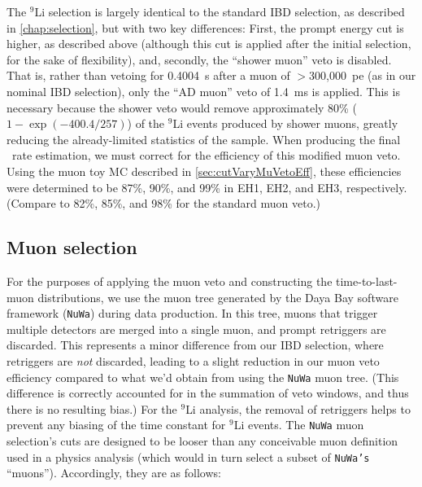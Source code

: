 \documentclass[../thesis.tex]{subfiles}
\begin{document}
The $^9$Li selection is largely identical to the standard IBD selection, as described in \autoref{chap:selection}, but with two key differences: First, the prompt energy cut is higher, as described above (although this cut is applied after the initial selection, for the sake of flexibility), and, secondly, the ``shower muon'' veto is disabled. That is, rather than vetoing for 0.4004~s after a muon of $>$300,000~pe (as in our nominal IBD selection), only the ``AD muon'' veto of 1.4~ms is applied. This is necessary because the shower veto would remove approximately 80\% ($1 - \exp(-400.4/257)$) of the $^9$Li events produced by shower muons, greatly reducing the already-limited statistics of the sample. When producing the final \linine\ rate estimation, we must correct for the efficiency of this modified muon veto. Using the muon toy MC described in \autoref{sec:cutVaryMuVetoEff}, these efficiencies were determined to be 87\%, 90\%, and 99\% in EH1, EH2, and EH3, respectively. (Compare to 82\%, 85\%, and 98\% for the standard muon veto.)


\subsection{Muon selection}
\label{sec:bkgLi9MuonSel}

For the purposes of applying the muon veto and constructing the time-to-last-muon distributions, we use the muon tree generated by the Daya Bay software framework (\texttt{NuWa}) during data production. In this tree, muons that trigger multiple detectors are merged into a single muon, and prompt retriggers are discarded. This represents a minor difference from our IBD selection, where retriggers are \emph{not} discarded, leading to a slight reduction in our muon veto efficiency compared to what we'd obtain from using the \texttt{NuWa} muon tree. (This difference is correctly accounted for in the summation of veto windows, and thus there is no resulting bias.) For the $^9$Li analysis, the removal of retriggers helps to prevent any biasing of the time constant for $^9$Li events. The \texttt{NuWa} muon selection's cuts are designed to be looser than any conceivable muon definition used in a physics analysis (which would in turn select a subset of \texttt{NuWa's} ``muons''). Accordingly, they are as follows:
\end{document}

